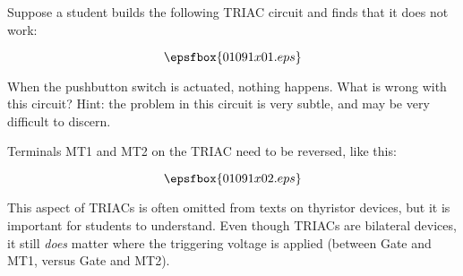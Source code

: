 

Suppose a student builds the following TRIAC circuit and finds that it does not work:

$$\epsfbox{01091x01.eps}$$

When the pushbutton switch is actuated, nothing happens.  What is wrong with this circuit?  Hint: the problem in this circuit is very subtle, and may be very difficult to discern.







Terminals MT1 and MT2 on the TRIAC need to be reversed, like this:

$$\epsfbox{01091x02.eps}$$







This aspect of TRIACs is often omitted from texts on thyristor devices, but it is important for students to understand.  Even though TRIACs are bilateral devices, it still {\it does} matter where the triggering voltage is applied (between Gate and MT1, versus Gate and MT2).




